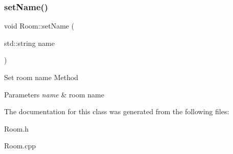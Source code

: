 \mbox{\label{class_room_af7f292c9e840184a5df8525687e87367}} 
\subsubsection{\texorpdfstring{set\+Name()}{setName()}}
{\footnotesize\ttfamily void Room\+::set\+Name (\begin{DoxyParamCaption}\item[{std\+::string}]{name }\end{DoxyParamCaption})}

Set room name Method 
\begin{DoxyParams}{Parameters}
{\em name} & room name \\
\hline
\end{DoxyParams}


The documentation for this class was generated from the following files\+:\begin{DoxyCompactItemize}
\item 
Room.\+h\item 
Room.\+cpp\end{DoxyCompactItemize}
